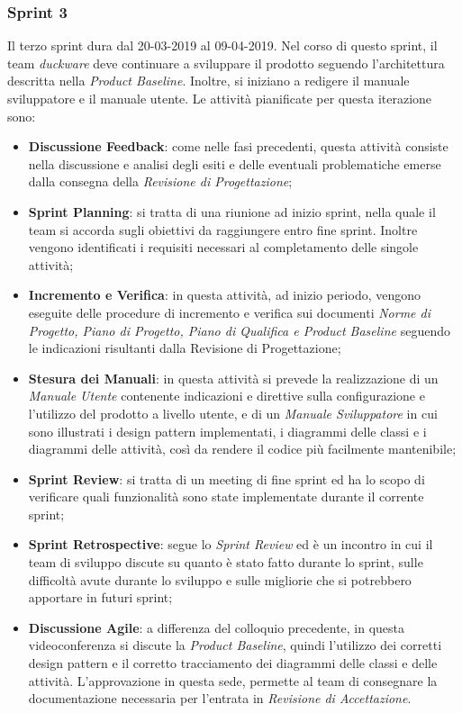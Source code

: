 \subsubsection{Sprint 3}
Il terzo sprint dura dal 20-03-2019 al 09-04-2019. Nel corso di questo sprint, il team \emph{duckware} deve continuare a sviluppare il prodotto seguendo l'architettura descritta nella \emph{Product Baseline}. Inoltre, si iniziano a redigere il manuale sviluppatore e il manuale utente.
Le attività pianificate per questa iterazione sono:
	\begin{itemize}
		\item \textbf{Discussione Feedback}: come nelle fasi precedenti, questa attività consiste nella discussione e analisi degli esiti e delle eventuali problematiche emerse dalla consegna della \emph{Revisione di Progettazione};	
		\item \textbf{Sprint Planning}: si tratta di una riunione ad inizio sprint, nella quale il team si accorda sugli obiettivi da raggiungere entro fine sprint. Inoltre vengono identificati i requisiti necessari al completamento delle singole attività;
		\item \textbf{Incremento e Verifica}: in questa attività, ad inizio periodo, vengono eseguite delle procedure di incremento e verifica sui documenti \emph{Norme di Progetto, Piano di Progetto, Piano di Qualifica e Product Baseline} seguendo le indicazioni risultanti dalla Revisione di Progettazione;
		\item \textbf{Stesura dei Manuali}: in questa attività si prevede la realizzazione di un \emph{Manuale Utente} contenente indicazioni e direttive sulla configurazione e l'utilizzo del prodotto a livello utente, e di un \emph{Manuale Sviluppatore} in cui sono illustrati i design pattern implementati, i diagrammi delle classi e i diagrammi delle attività, così da rendere il codice più facilmente mantenibile;
		\item \textbf{Sprint Review}: si tratta di un meeting di fine sprint ed ha lo scopo di verificare quali funzionalità sono state implementate durante il corrente sprint;
		\item \textbf{Sprint Retrospective}: segue lo \emph{Sprint Review} ed è un incontro in cui il team di sviluppo discute su quanto è stato fatto durante lo sprint, sulle difficoltà avute durante lo sviluppo e sulle migliorie che si potrebbero apportare in futuri sprint;
		\item \textbf{Discussione Agile}: a differenza del colloquio precedente, in questa videoconferenza si discute la \emph{Product Baseline}, quindi l'utilizzo dei corretti design pattern e il corretto tracciamento dei diagrammi delle classi e delle attività. L'approvazione in questa sede, permette al team di consegnare la documentazione necessaria per l'entrata in \emph{Revisione di Accettazione}.
	\end{itemize}
